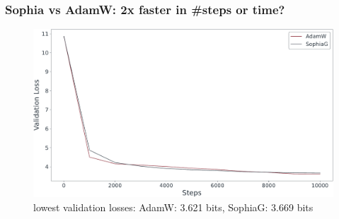 \documentclass[
	11pt, %
	aspectratio=169, %
]{beamer}
\begin{document}
 \begin{frame}
	\frametitle{Sophia vs AdamW: 2x faster in \#steps or time?}
	\begin{figure}
		\includegraphics[width=12cm]{../results/steps_adam_sophia.pdf}
		\caption{lowest validation losses: AdamW: 3.621 bits, SophiaG: 3.669 bits}
	\end{figure}
\end{frame}
\end{document}
